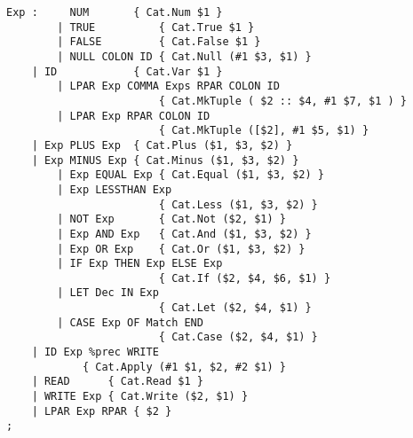 \documentclass [10pt,a4paper]{article}
\begin{document}
\begin{lstlisting}[frame=single,language=Clean]    
Exp :	  NUM		{ Cat.Num $1 }
        | TRUE          { Cat.True $1 }
        | FALSE         { Cat.False $1 }
        | NULL COLON ID { Cat.Null (#1 $3, $1) }
	| ID            { Cat.Var $1 }
        | LPAR Exp COMMA Exps RPAR COLON ID
                        { Cat.MkTuple ( $2 :: $4, #1 $7, $1 ) }
        | LPAR Exp RPAR COLON ID 
                        { Cat.MkTuple ([$2], #1 $5, $1) }
	| Exp PLUS Exp	{ Cat.Plus ($1, $3, $2) }
	| Exp MINUS Exp	{ Cat.Minus ($1, $3, $2) }
        | Exp EQUAL Exp { Cat.Equal ($1, $3, $2) }
        | Exp LESSTHAN Exp
                        { Cat.Less ($1, $3, $2) }
        | NOT Exp       { Cat.Not ($2, $1) }
        | Exp AND Exp   { Cat.And ($1, $3, $2) }
        | Exp OR Exp    { Cat.Or ($1, $3, $2) }
        | IF Exp THEN Exp ELSE Exp
                        { Cat.If ($2, $4, $6, $1) }
        | LET Dec IN Exp
                        { Cat.Let ($2, $4, $1) }
        | CASE Exp OF Match END
                        { Cat.Case ($2, $4, $1) }
	| ID Exp %prec WRITE
			{ Cat.Apply (#1 $1, $2, #2 $1) }
	| READ		{ Cat.Read $1 }
	| WRITE Exp	{ Cat.Write ($2, $1) }
	| LPAR Exp RPAR { $2 }
;
\end{lstlisting}
\end{document}
